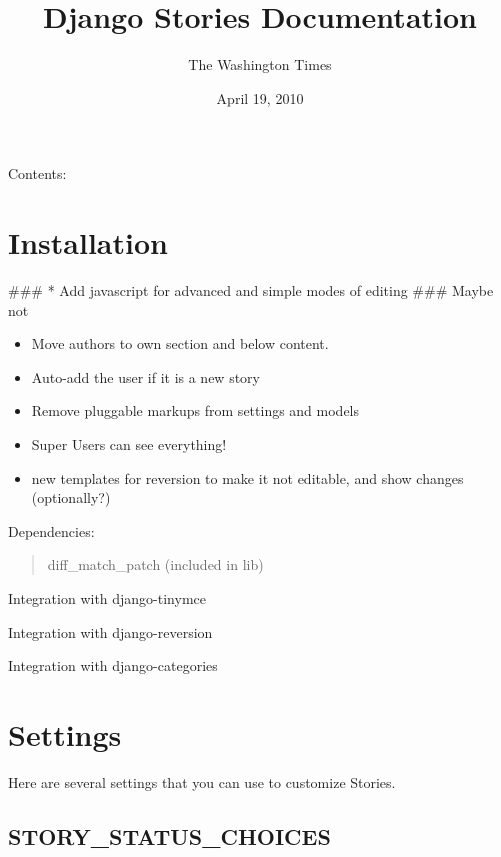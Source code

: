 \documentclass[letterpaper,10pt,english]{manual}
\title{Django Stories Documentation}
\date{April 19, 2010}
\author{The Washington Times}
\begin{document}
\maketitle
\tableofcontents
\hypertarget{--doc-index}{}


Contents:

\resetcurrentobjects
\hypertarget{--doc-install}{}

\chapter{Installation}

\#\#\# * Add javascript for advanced and simple modes of editing \#\#\# Maybe not
\begin{itemize}
\item {} 
Move authors to own section and below content.

\item {} 
Auto-add the user if it is a new story

\item {} 
Remove pluggable markups from settings and models

\item {} 
Super Users can see everything!

\item {} 
new templates for reversion to make it not editable, and show changes (optionally?)

\end{itemize}

Dependencies:
\begin{quote}

diff\_match\_patch (included in lib)
\end{quote}

Integration with django-tinymce

Integration with django-reversion

Integration with django-categories

\resetcurrentobjects
\hypertarget{--doc-settings}{}

\hypertarget{settings}{}\chapter{Settings}

Here are several settings that you can use to customize Stories.


\hypertarget{story-status-choices}{}\section{STORY\_STATUS\_CHOICES}
\end{document}

